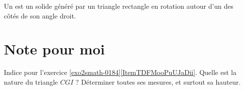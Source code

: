 \begin{definition}
    Un  est un solide généré par un triangle rectangle en rotation autour d'un des côtés de son angle droit.
\end{definition}



\section{Note pour moi}

Indice pour l'exercice \ref{exo2smath-0184}\ref{ItemTDFMooPuUJaDii}. Quelle est la nature du triangle \( CGI\) ? Déterminer toutes ses mesures, et surtout sa hauteur.



